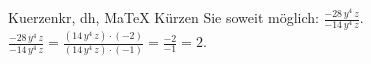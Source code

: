 \begin{MAufgabe}{Kuerzen}{kr, dh, MaTeX}
K\"urzen Sie soweit m\"oglich: $\frac{- 28\, y^4\, z}{- 14\, y^4\, z}$.\\ 
\ifLsg\MLoesung
\quad $\frac{- 28\, y^4\, z}{- 14\, y^4\, z}=\frac{(14\, y^4\, z)\cdot(-2)}{(14\, y^4\, z)\cdot(-1)}=\frac{-2}{-1}=2$.\else\relax\fi
 \end{MAufgabe}